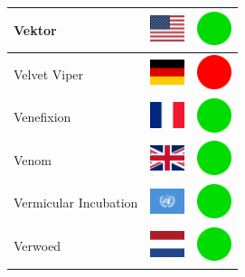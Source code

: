 \documentclass[12pt, a4paper, twoside]{report}
\begin{document}
\begin{center}
\begin{longtable}{|p{5cm}|p{2cm}|p{2cm}|}
 Vektor                                                     & \includegraphics[width=1cm]{../img/flags/us} &   \includegraphics[width=1cm]{../likes/y} \\ \hline
 Velvet Viper                                               & \includegraphics[width=1cm]{../img/flags/de} &   \includegraphics[width=1cm]{../likes/n} \\ \hline
 Venefixion                                                 & \includegraphics[width=1cm]{../img/flags/fr} &   \includegraphics[width=1cm]{../likes/y} \\ \hline
 Venom                                                      & \includegraphics[width=1cm]{../img/flags/gb} &   \includegraphics[width=1cm]{../likes/y} \\ \hline
 Vermicular Incubation                                      & \includegraphics[width=1cm]{../img/flags/un} &   \includegraphics[width=1cm]{../likes/y} \\ \hline
 Verwoed                                                    & \includegraphics[width=1cm]{../img/flags/nl} &   \includegraphics[width=1cm]{../likes/y} \\ \hline

\end{longtable}
\end{center}
\end{document}
